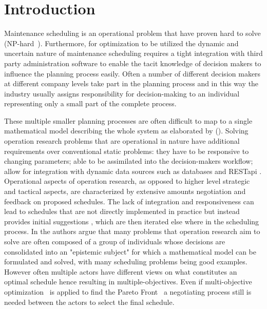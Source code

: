 \documentclass[preprint,12pt,authoryear]{elsarticle}
\begin{document}
\section{Introduction}
\label{sec:1-introduction}

Maintenance scheduling is an operational problem that have proven hard to solve (NP-hard~\cite{???}). Furthermore, for optimization to be utilized the dynamic and uncertain nature of maintenance scheduling requires a tight integration with third party administration software to enable the tacit knowledge of decision makers to influence the planning process easily. Often a number of different decision makers at different company levels take part in the planning process and in this way the industry usually assigns responsibility for decision-making  to an individual representing only a small part of the complete process. 

These multiple smaller planning processes are often difficult to map to a single mathematical model describing the whole system as elaborated by (\citep{barthelemy_human_2002}). Solving operation research problems that are operational in nature have additional requirements over conventional static problems: they have to be responsive to changing parameters; able to be assimilated into the decision-makers workflow; allow for integration with dynamic data sources such as databases and RESTapi \citep{meignan_review_2015}. Operational aspects of operation research, as opposed to higher level strategic and tactical aspects, are characterized by extensive amounts negotiation and feedback on proposed schedules. The lack of integration and responsiveness can lead to schedules that are not directly implemented in practice but instead provides initial suggestions \cite{meignan_review_2015}, which are then iterated else where in the scheduling process. In \citep{barthelemy_human_2002} the authors argue that many problems that operation research aim to solve are often composed of a group of individuals whose decisions are consolidated into an "epistemic subject" for which a mathematical model can be formulated and solved, with many scheduling problems being good examples. However often multiple actors have different views on what constitutes an optimal schedule hence resulting in multiple-objectives. Even if multi-objective optimization~\citep{???} is applied to find the Pareto Front~\citep{???} a negotiating process still is needed between the actors to select the final schedule.
\end{document}
